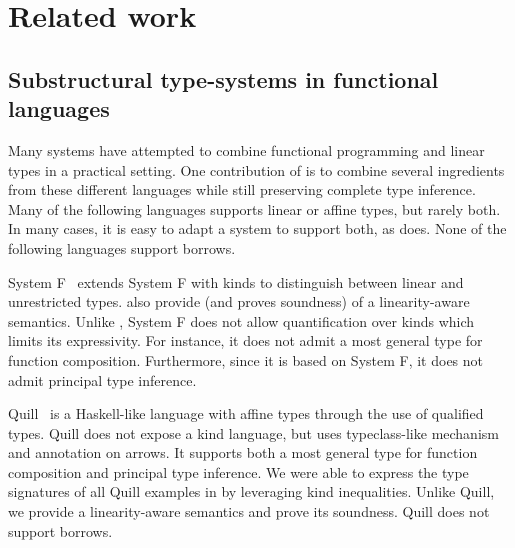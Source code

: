 \section{Related work}
\label{sec:related-work}





\subsection{Substructural type-systems in functional languages}

Many systems have attempted to combine
functional programming and linear types in a practical setting.
One contribution of \lang is to combine several ingredients
from these different languages while still preserving
complete type inference.
Many of the following languages supports linear or affine types, but rarely
both. In many cases, it is easy to adapt a system to support both, as
\lang does.
None of the following languages support borrows.

System F\degree~\citep{DBLP:conf/tldi/MazurakZZ10}
extends System F with kinds to distinguish
between linear and unrestricted types.
\citet{DBLP:conf/tldi/MazurakZZ10} also provide
(and proves soundness) of a linearity-aware semantics.
Unlike \lang, System F\degree{} does not allow
quantification over kinds which limits its expressivity. For instance, it
does not admit a most general type for function composition.
Furthermore, since it is based on System F, it does not admit
principal type inference.

Quill~\citep{DBLP:conf/icfp/Morris16} is a Haskell-like language with affine
types through the use of qualified types.
Quill does not expose a kind language, but
uses typeclass-like mechanism and annotation on arrows.
It supports both a most general type for function composition and
principal type inference.
We were able to express the type signatures of all Quill examples
in \lang by leveraging kind inequalities.
Unlike Quill,
we provide a linearity-aware semantics and prove its soundness.
Quill does not support borrows.


